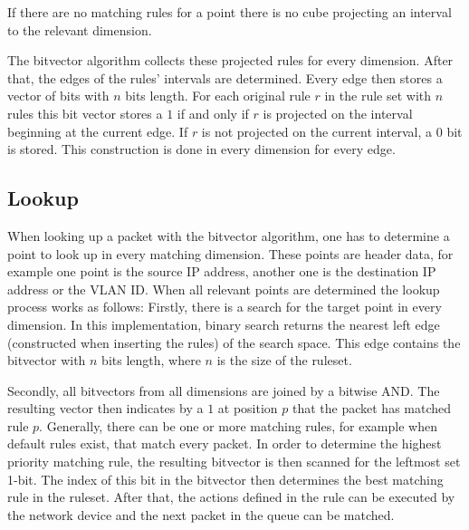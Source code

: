 \documentclass[a4paper,
		12pt,
		parskip=full,
		titlepage
		]{scrartcl}
\begin{document}
If there are no matching rules for a point there is no cube projecting an interval to the relevant dimension.

The bitvector algorithm collects these projected rules for every dimension.
After that, the edges of the rules' intervals are determined.
Every edge then stores a vector of bits with $n$ bits length.
For each original rule $r$ in the rule set with $n$ rules this bit vector stores a $1$ if and only if $r$ is projected on the interval beginning at the current edge.
If $r$ is not projected on the current interval, a $0$ bit is stored.
This construction is done in every dimension for every edge.

\subsection{Lookup}
When looking up a packet with the bitvector algorithm, one has to determine a point to look up in every matching dimension.
These points are header data, for example one point is the source IP address, another one is the destination IP address or the VLAN ID.
When all relevant points are determined the lookup process works as follows:
Firstly, there is a search for the target point in every dimension.
In this implementation, binary search returns the nearest left edge (constructed when inserting the rules) of the search space.
This edge contains the bitvector with $n$ bits length, where $n$ is the size of the ruleset.

Secondly, all bitvectors from all dimensions are joined by a bitwise AND.
The resulting vector then indicates by a $1$ at position $p$ that the packet has matched rule $p$.
Generally, there can be one or more matching rules, for example when default rules exist, that match every packet.
In order to determine the highest priority matching rule, the resulting bitvector is then scanned for the leftmost set 1-bit.
The index of this bit in the bitvector then determines the best matching rule in the ruleset.
After that, the actions defined in the rule can be executed by the network device and the next packet in the queue can be matched.
\end{document}
